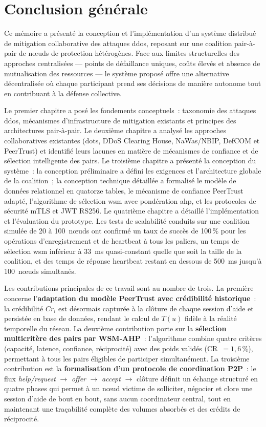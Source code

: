 \chapter*{Conclusion générale}

Ce mémoire a présenté la conception et l'implémentation d'un système distribué de mitigation collaborative des attaques \gls{ddos}, reposant sur une coalition pair-à-pair de n\oe{}uds de protection hétérogènes. Face aux limites structurelles des approches centralisées --- points de défaillance uniques, coûts élevés et absence de mutualisation des ressources --- le système proposé offre une alternative décentralisée où chaque participant prend ses décisions de manière autonome tout en contribuant à la défense collective.

Le premier chapitre a posé les fondements conceptuels~: taxonomie des attaques \gls{ddos}, mécanismes d'infrastructure de mitigation existants et principes des architectures pair-à-pair. Le deuxième chapitre a analysé les approches collaboratives existantes (\gls{dots}, DDoS Clearing House, NaWas/NBIP, DefCOM et PeerTrust) et identifié leurs lacunes en matière de mécanismes de confiance et de sélection intelligente des pairs. Le troisième chapitre a présenté la conception du système~: la conception préliminaire a défini les exigences et l'architecture globale de la coalition~; la conception technique détaillée a formalisé le modèle de données relationnel en quatorze tables, le mécanisme de confiance PeerTrust adapté, l'algorithme de sélection \gls{wsm} avec pondération \gls{ahp}, et les protocoles de sécurité mTLS et JWT RS256. Le quatrième chapitre a détaillé l'implémentation et l'évaluation du prototype. Les tests de scalabilité conduits sur une coalition simulée de 20 à 100~n\oe{}uds ont confirmé un taux de succès de 100\,\% pour les opérations d'enregistrement et de heartbeat à tous les paliers, un temps de sélection \gls{wsm} inférieur à 33~ms quasi-constant quelle que soit la taille de la coalition, et des temps de réponse heartbeat restant en dessous de 500~ms jusqu'à 100~n\oe{}uds simultanés.

Les contributions principales de ce travail sont au nombre de trois. La première concerne l'\textbf{adaptation du modèle PeerTrust avec crédibilité historique}~: la crédibilité $Cr_i$ est désormais capturée à la clôture de chaque session d'aide et persistée en base de données, rendant le calcul de $T(u)$ fidèle à la réalité temporelle du réseau. La deuxième contribution porte sur la \textbf{sélection multicritère des pairs par WSM-AHP}~: l'algorithme combine quatre critères (capacité, latence, confiance, réciprocité) avec des poids validés (CR~$= 1{,}6\,\%$), permettant à tous les pairs éligibles de participer simultanément. La troisième contribution est la \textbf{formalisation d'un protocole de coordination P2P}~: le flux \textit{help/request} $\to$ \textit{offer} $\to$ \textit{accept} $\to$ clôture définit un échange structuré en quatre phases qui permet à un n\oe{}ud victime de solliciter, négocier et clore une session d'aide de bout en bout, sans aucun coordinateur central, tout en maintenant une traçabilité complète des volumes absorbés et des crédits de réciprocité.

